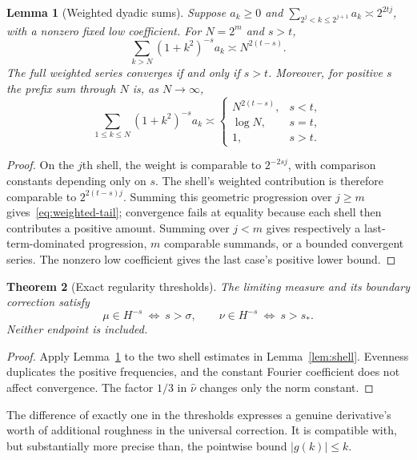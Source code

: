 \documentclass[11pt,a4paper]{article}
\numberwithin{equation}{section}
\newtheorem{theorem}{Theorem}[section]
\newtheorem{lemma}[theorem]{Lemma}
\theoremstyle{definition}
\theoremstyle{remark}
\begin{document}
\begin{lemma}[Weighted dyadic sums]
\label{lem:weighted}
Suppose $a_k\ge0$ and
$\sum_{2^j<k\le2^{j+1}}a_k\asymp2^{2tj}$, with a nonzero fixed low coefficient.
For $N=2^m$ and $s>t$,
\begin{equation}
 \sum_{k>N}(1+k^2)^{-s}a_k\asymp N^{2(t-s)}.
 \label{eq:weighted-tail}
\end{equation}
The full weighted series converges if and only if $s>t$. Moreover, for positive
$s$ the prefix sum through $N$ is, as $N\to\infty$,
\begin{equation}
 \sum_{1\le k\le N}(1+k^2)^{-s}a_k\asymp
 \begin{cases}
 N^{2(t-s)},&s<t,\\
 \log N,&s=t,\\
 1,&s>t.
 \end{cases}
 \label{eq:weighted-prefix}
\end{equation}
\end{lemma}
\begin{proof}
On the $j$th shell, the weight is comparable to $2^{-2sj}$, with comparison
constants depending only on $s$. The shell's weighted contribution is therefore
comparable to $2^{2(t-s)j}$. Summing this geometric progression over $j\ge m$
gives~\eqref{eq:weighted-tail}; convergence fails at equality because each shell
then contributes a positive amount. Summing over $j<m$ gives respectively a
last-term-dominated progression, $m$ comparable summands, or a bounded convergent
series. The nonzero low coefficient gives the last case's positive lower bound.
\end{proof}

\begin{theorem}[Exact regularity thresholds]
\label{thm:regularity}
The limiting measure and its boundary correction satisfy
\begin{equation}
 \mu\in H^{-s}\ \Longleftrightarrow\ s>\sigma,
 \qquad
 \nu\in H^{-s}\ \Longleftrightarrow\ s>s_*.
 \label{eq:regularity}
\end{equation}
Neither endpoint is included.
\end{theorem}
\begin{proof}
Apply Lemma~\ref{lem:weighted} to the two shell estimates in
Lemma~\ref{lem:shell}. Evenness duplicates the positive frequencies, and the
constant Fourier coefficient does not affect convergence. The factor $1/3$
in $\widehat\nu$ changes only the norm constant.
\end{proof}

The difference of exactly one in the thresholds expresses a genuine derivative's
worth of additional roughness in the universal correction. It is compatible with,
but substantially more precise than, the pointwise bound $|g(k)|\le k$.
\end{document}
